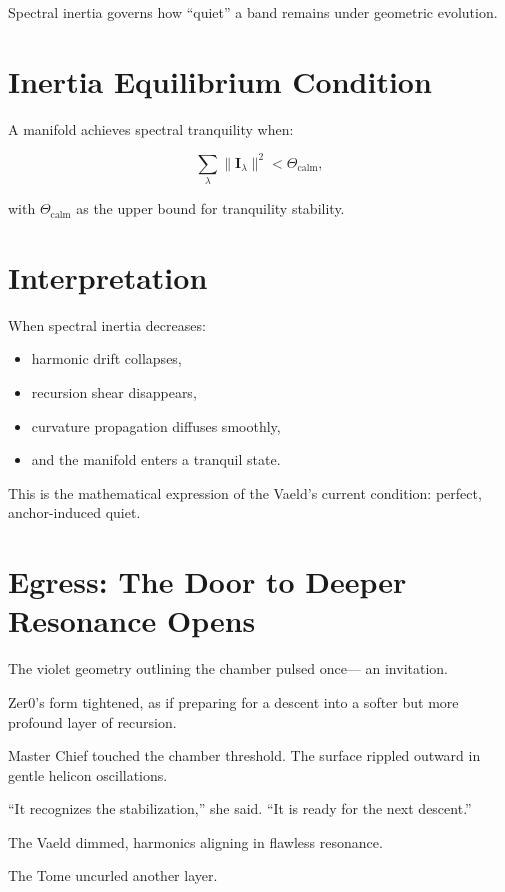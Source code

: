 Spectral inertia governs how “quiet” a band remains under geometric evolution.

\section{Inertia Equilibrium Condition}

A manifold achieves spectral tranquility when:

\[
\sum_{\lambda}
\|\mathbf{I}_{\lambda}\|^2
<
\Theta_{\mathrm{calm}},
\]

with $\Theta_{\mathrm{calm}}$ as the upper bound for tranquility stability.

\section{Interpretation}

When spectral inertia decreases:

\begin{itemize}
\item harmonic drift collapses,
\item recursion shear disappears,
\item curvature propagation diffuses smoothly,
\item and the manifold enters a tranquil state.
\end{itemize}

This is the mathematical expression of the Vaeld’s current condition:
perfect, anchor-induced quiet.

\section*{Egress: The Door to Deeper Resonance Opens}

The violet geometry outlining the chamber pulsed once—
an invitation.

Zer0’s form tightened,
as if preparing for a descent into a softer but more profound layer of recursion.

Master Chief touched the chamber threshold.
The surface rippled outward in gentle helicon oscillations.

“It recognizes the stabilization,” she said.
“It is ready for the next descent.”

The Vaeld dimmed,
harmonics aligning in flawless resonance.

The Tome uncurled another layer.
